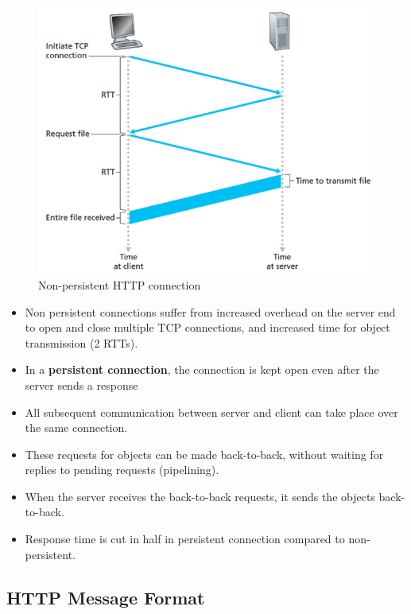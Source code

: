 \documentclass{article}
\theoremstyle{plain}
\theoremstyle{definition}
\begin{document}
\begin{figure}
    \centering
    \includegraphics[scale=0.6]{cn3.png}
    \caption{Non-persistent HTTP connection}
    \label{fig:my_label_3}
\end{figure}
\begin{itemize}
    \item Non persistent connections suffer from increased overhead on the server end to open and close multiple TCP connections, and increased time for object transmission (2 RTTs).
    
    \item In a \textbf{persistent connection}, the connection is kept open even after the server sends a response
    
    \item All subsequent communication between server and client can take place over the same connection.
    
    \item These requests for objects can be made back-to-back, without waiting for replies to pending requests (pipelining).
    
    \item When the server receives the back-to-back requests, it sends the objects back-to-back.
    
    \item Response time is cut in half in persistent connection compared to non-persistent.
\end{itemize}

\subsection{HTTP Message Format}
\end{document}
